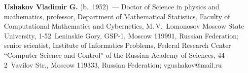 \vspace*{4pt}

\noindent
\textbf{Ushakov Vladimir G.} (b.\ 1952)~--- Doctor of Science in physics and mathematics, professor, 
Department of Mathematical Statistics, Faculty of Computational Mathematics and Cybernetics, M.\,V.~Lomonosov Moscow State University, 
1-52~Leninskie Gory, GSP-1, Moscow 119991, Russian Federation; senior scientist, Institute of Informatics Problems, 
Federal Research Center ``Computer Science and Control'' of the Russian Academy of Sciences, 44-2~Vavilov Str., Moscow 119333, Russian Federation; 
\mbox{vgushakov@mail.ru}



   
\label{end\stat}

\renewcommand{\bibname}{\protect\rm Литература} 
      